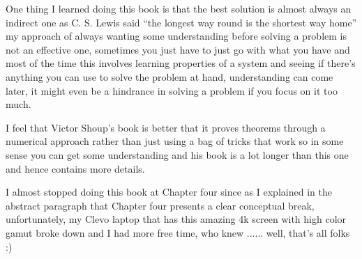\documentclass[aps,preprint,preprintnumbers,nofootinbib,showpacs,prd]{revtex4-1}
\begin{document}
One thing I learned doing this book is that the best solution is almost always an indirect one as C. S. Lewis said ``the longest way round is the shortest way home'' my approach of always wanting some understanding before solving a problem is not an effective one, sometimes you just have to just go with what you have and most of the time this involves learning properties of a system and seeing if there's anything you can use to solve the problem at hand, understanding can come later, it might even be a hindrance in solving a problem if you focus on it too much.

I feel that Victor Shoup's book is better that it proves theorems through a numerical approach rather than just using a bag of tricks that work so in some sense you can get some understanding and his book is a lot longer than this one and hence contains more details.

I almost stopped doing this book at Chapter four since as I explained in the abstract paragraph that Chapter four presents a clear conceptual break, unfortunately, my Clevo laptop that has this amazing 4k screen with high color gamut broke down and I had more free time, who knew ...... well, that's all folks :)
\end{document}
